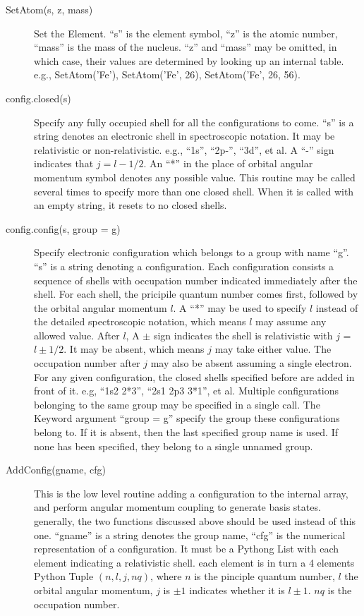 \documentclass[12pt]{article}
\begin{document}
\begin{description}
\item[SetAtom(s, z, mass)] 
Set the Element. ``s'' is the element symbol, ``z'' is
the atomic number, ``mass'' is the mass of the nucleus. ``z'' and ``mass'' may
be omitted, in which case, their values are determined by looking up an
internal table. e.g., SetAtom('Fe'), SetAtom('Fe', 26), SetAtom('Fe', 26, 56).

\item[config.closed(s)] 
Specify any fully occupied shell for all the
configurations to come. ``s'' is a string denotes an electronic shell in
spectroscopic notation. It may be relativistic or non-relativistic. e.g., 
``1s'', ``2p-'', ``3d'', et al. A ``-'' sign indicates that $j = l - 1/2$. 
An ``*'' in the place of orbital angular momentum symbol denotes any possible
value. This routine may be called several times to specify more than one closed
shell. When it is called with an empty string, it resets to no closed shells. 

\item[config.config(s, group = g)] 
Specify electronic configuration which
belongs to a group with name ``g''. ``s'' is a string denoting a
configuration. Each configuration consists a sequence of shells with
occupation number indicated immediately after the shell. For each shell, the
pricipile quantum 
number comes first, followed by the orbital angular momentum $l$. A ``*'' may
be used to specify $l$ instead of the detailed spectroscopic notation, which
means $l$ may assume any allowed value. After $l$,  A $\pm$ sign
indicates the shell is relativistic with $j$ = $l\pm 1/2$. It may be absent,
which means $j$ may take either value. The occupation number after $j$ may
also be absent assuming a single electron. For any given configuration, the
closed shells specified before are added in front of it. e.g, ``1s2 2*3'', 
``2s1 2p3 3*1'', et al. Multiple configurations belonging to the same group
may be specified in a single call. The Keyword argument ``group = g'' specify
the group these configurations belong to. If it is absent, 
then the last specified group name is used. If none has been specified, they
belong to a single unnamed group. 

\item[AddConfig(gname, cfg)] 
This is the low level routine adding a
configuration to the internal array, and perform angular momentum coupling to
generate basis states. generally, the two functions discussed above should be
used instead of this one. ``gname'' is a string denotes the group name, 
``cfg'' is the numerical representation of a configuration. It must be a
Pythong List with 
each element indicating a relativistic shell. each element is in turn a 4
elements Python Tuple $(n, l, j, nq)$, where $n$ is the pinciple quantum
number, $l$ the orbital angular momentum, $j$ is $\pm 1$ indicates whether it
is $l\pm 1$. $nq$ is the occupation number.

\end{description}
\end{document}
